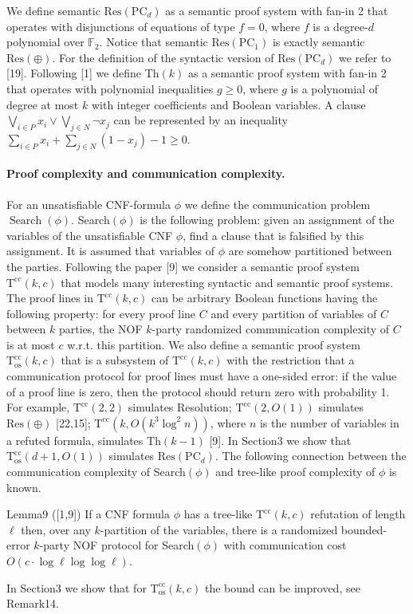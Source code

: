We define semantic $\mathrm{Res}(\mathrm{PC}_d)$ as a semantic proof system with fan-in 2 that operates with disjunctions of equations of type $f=0$, where $f$ is a degree-$d$ polynomial over $\mathbb F_2$. Notice that semantic $\mathrm{Res}(\mathrm{PC}_1)$ is exactly semantic $\mathrm{Res}(\oplus)$. For the definition of the syntactic version of $\mathrm{Res}(\mathrm{PC}_d)$ we refer to [19].
Following [1] we define $\mathrm{Th}(k)$ as a semantic proof system with fan-in 2 that operates with polynomial inequalities $g\ge0$, where $g$ is a polynomial of degree at most $k$ with integer coefficients and Boolean variables. A clause $\bigvee_{i\in P}x_i\vee\bigvee_{j\in N}\neg x_j$ can be represented by an inequality $\sum_{i\in P}x_i+\sum_{j\in N}(1-x_j)-1\ge0$.
\paragraph{Proof complexity and communication complexity.} For an unsatisfiable CNF-formula $\phi$ we define the communication problem $\operatorname{Search}(\phi)$. Search$(\phi)$ is the following problem: given an assignment of the variables of the unsatisfiable CNF $\phi$, find a clause that is falsified by this assignment. It is assumed that variables of $\phi$ are somehow partitioned between the parties.
Following the paper [9] we consider a semantic proof system $\mathrm T^{\mathrm{cc}}(k,c)$ that models many interesting syntactic and semantic proof systems. The proof lines in $\mathrm T^{\mathrm{cc}}(k,c)$ can be arbitrary Boolean functions having the following property: for every proof line $C$ and every partition of variables of $C$ between $k$ parties, the NOF $k$-party randomized communication complexity of $C$ is at most $c$ w.r.t. this partition. We also define a semantic proof system $\mathrm T^{\mathrm{cc}}_{\mathrm{os}}(k,c)$ that is a subsystem of $\mathrm T^{\mathrm{cc}}(k,c)$ with the restriction that a communication protocol for proof lines must have a one-sided error: if the value of a proof line is zero, then the protocol should return zero with probability 1.
For example, $\mathrm T^{\mathrm{cc}}(2,2)$ simulates Resolution; $\mathrm T^{\mathrm{cc}}(2,O(1))$ simulates $\mathrm{Res}(\oplus)$ [22,15]; $\mathrm T^{\mathrm{cc}}(k,O(k^3\log^2n))$, where $n$ is the number of variables in a refuted formula, simulates $\mathrm{Th}(k-1)$ [9]. In Section3 we show that $\mathrm T^{\mathrm{cc}}_{\mathrm{os}}(d+1,O(1))$ simulates $\mathrm{Res}(\mathrm{PC}_d)$.
The following connection between the communication complexity of Search$(\phi)$ and tree-like proof complexity of $\phi$ is known.
\begin{authorclaim}{Lemma9 ([1,9])}
If a CNF formula $\phi$ has a tree-like $\mathrm T^{\mathrm{cc}}(k,c)$ refutation of length $\ell$ then, over any $k$-partition of the variables, there is a randomized bounded-error $k$-party NOF protocol for Search$(\phi)$ with communication cost $O(c\cdot\log\ell\log\log\ell)$.
\end{authorclaim}
In Section3 we show that for $\mathrm T^{\mathrm{cc}}_{\mathrm{os}}(k,c)$ the bound can be improved, see Remark14.
